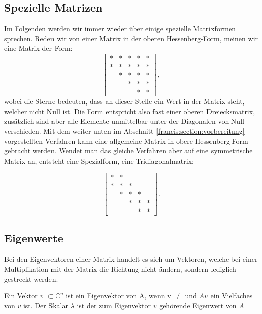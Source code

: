 \subsection{Spezielle Matrizen\label{francis:section:grundlagen:spezielle_matrizen}}
Im Folgenden werden wir immer wieder über einige spezielle Matrixformen sprechen.
Reden wir von einer Matrix in der oberen Hessenberg-Form, meinen wir eine Matrix der Form:
\begin{equation}
	\begin{bmatrix}
	* & * & * & * & * \\
	* & * & * & * & * \\
	& * & * & * & * \\
	&   & * & * & * \\
	&   &   & * & *
	\end{bmatrix},
\end{equation}
wobei die Sterne bedeuten, dass an dieser Stelle ein Wert in der Matrix steht, welcher nicht Null ist.
Die Form entspricht also fast einer oberen Dreiecksmatrix, zusätzlich sind aber alle Elemente unmittelbar unter der Diagonalen von Null verschieden.
Mit dem weiter unten im Abschnitt \ref{francis:section:vorbereitung} vorgestellten Verfahren kann eine allgemeine Matrix in obere Hessenberg-Form gebracht werden. Wendet man das gleiche Verfahren aber auf eine symmetrische Matrix an, entsteht eine Spezialform, eine Tridiagonalmatrix:

\begin{equation}
	\begin{bmatrix}
	* & * &   &   &   \\
	* & * & *  &   &   \\
	& * & * & * &  \\
	&   & * & * & * \\
	&   &   & * & *
	\end{bmatrix}.
\end{equation}

\subsection{Eigenwerte\label{francis:section:grundlagen:eigenwerte}}
Bei den Eigenvektoren einer Matrix handelt es sich um Vektoren, welche bei einer Multiplikation mit der Matrix die Richtung nicht ändern, sondern lediglich gestreckt werden.

\begin{satz}
	Ein Vektor $v$ $\subset \mathbb{C}^n$ ist ein Eigenvektor von A, wenn v $\neq$ und $Av$ ein Vielfaches von $v$ ist. Der Skalar $\lambda$ ist der zum Eigenvektor $v$ gehörende Eigenwert von $A$
\end{satz}

